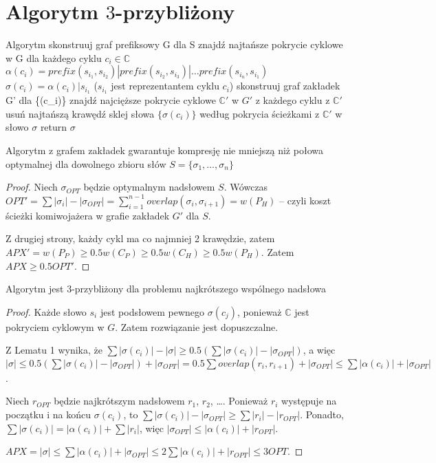 \section{Algorytm $3$-przybliżony}

Algorytm
	skonstruuj graf prefiksowy G dla S
	znajdź najtańsze pokrycie cyklowe  w G
	dla każdego cyklu $c_i \in \mathbb{C}$
		$\alpha(c_i) = prefix(s_i_1, s_i_2) | prefix(s_i_2, s_i_3) | \ldots prefix(s_i_n, s_i_1)$
		$\sigma(c_i) = \alpha(c_i) | s_i_1$ ($s_i_1$ jest reprezentantem cyklu $c_i$)
	skonstruuj graf zakładek G' dla \{\sigma(c_i)\}
	znajdź najcięższe pokrycie cyklowe $\mathbb{C}'$ w $G'$
	z każdego cyklu z $\mathbb{C}'$ usuń najtańszą krawędź
	sklej słowa $\{\sigma(c_i)\}$ według pokrycia ścieżkami z $\mathbb{C}'$ w słowo $\sigma$
	return $\sigma$

\begin{lemma}
	Algorytm z grafem zakładek gwarantuje kompresję nie mniejszą niż połowa optymalnej dla dowolnego zbioru słów $S = \{\sigma_1, \ldots, \sigma_n\}$
\end{lemma}

\begin{proof}
	Niech $\sigma_{OPT}$ będzie optymalnym nadsłowem $S$. Wówczas $OPT' = \sum |\sigma_i| - |\sigma_{OPT}| = \sum_{i = 1}^{n - 1} overlap(\sigma_i, \sigma_{i + 1}) = w(P_H)$ -- czyli koszt ścieżki komiwojażera w grafie zakładek $G'$ dla $S$.
	
	Z drugiej strony, każdy cykl ma co najmniej 2 krawędzie, zatem $APX' = w(P_P) \ge 0.5 w(C_P) \ge 0.5 w(C_H) \ge 0.5 w(P_H)$. Zatem $APX \ge 0.5 OPT'$.
\end{proof}
	
\begin{theorem}
	Algorytm jest $3$-przybliżony dla problemu najkrótszego wspólnego nadsłowa
\end{theorem}

\begin{proof}
	Każde słowo $s_i$ jest podsłowem pewnego $\sigma(c_j)$, ponieważ $\mathbb{C}$ jest pokryciem cyklowym w $G$. Zatem rozwiązanie jest dopuszczalne.

	Z Lematu 1 wynika, że $\sum |\sigma(c_i)| - |\sigma| \ge 0.5 (\sum |\sigma(c_i)| - |\sigma_{OPT}|)$, a więc $|\sigma| \le 0.5 (\sum |\sigma(c_i)| - |\sigma_{OPT}|) + |\sigma_{OPT}| = 0.5 \sum overlap(r_i, r_{i + 1}) + |\sigma_{OPT}| \le \sum |\alpha(c_i)| + |\sigma_{OPT}|$.
	
	Niech $r_{OPT}$ będzie najkrótszym nadsłowem $r_1$, $r_2$, \ldots. Ponieważ $r_i$ występuje na początku i na końcu $\sigma(c_i)$, to $\sum |\sigma(c_i)| - |\sigma_{OPT}| \ge \sum |r_i| - |r_{OPT}|$. Ponadto, $\sum |\sigma(c_i)| = |\alpha(c_i)| + \sum |r_i|$, więc $|\sigma_{OPT}| \le |\alpha(c_i)| + |r_{OPT}|$.
	
	$APX = |\sigma| \le \sum |\alpha(c_i)| + |\sigma_{OPT}| \le 2 \sum |\alpha(c_i)| + |r_{OPT}| \le 3 OPT$.
\end{proof}
